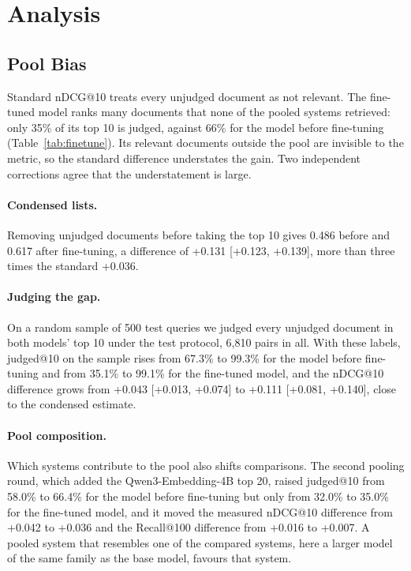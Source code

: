 \section{Analysis}
\label{sec:analysis}

\subsection{Pool Bias}
\label{sec:poolbias}

Standard nDCG@10 treats every unjudged document as not relevant. The fine-tuned model ranks many documents that none of the pooled systems retrieved: only 35\% of its top 10 is judged, against 66\% for the model before fine-tuning (Table~\ref{tab:finetune}). Its relevant documents outside the pool are invisible to the metric, so the standard difference understates the gain. Two independent corrections agree that the understatement is large.

\paragraph{Condensed lists.} Removing unjudged documents before taking the top 10 gives 0.486 before and 0.617 after fine-tuning, a difference of +0.131 [+0.123, +0.139], more than three times the standard +0.036.

\paragraph{Judging the gap.} On a random sample of 500 test queries we judged every unjudged document in both models' top 10 under the test protocol, 6,810 pairs in all. With these labels, judged@10 on the sample rises from 67.3\% to 99.3\% for the model before fine-tuning and from 35.1\% to 99.1\% for the fine-tuned model, and the nDCG@10 difference grows from +0.043 [+0.013, +0.074] to +0.111 [+0.081, +0.140], close to the condensed estimate.

\paragraph{Pool composition.} Which systems contribute to the pool also shifts comparisons. The second pooling round, which added the Qwen3-Embedding-4B top 20, raised judged@10 from 58.0\% to 66.4\% for the model before fine-tuning but only from 32.0\% to 35.0\% for the fine-tuned model, and it moved the measured nDCG@10 difference from +0.042 to +0.036 and the Recall@100 difference from +0.016 to +0.007. A pooled system that resembles one of the compared systems, here a larger model of the same family as the base model, favours that system.

